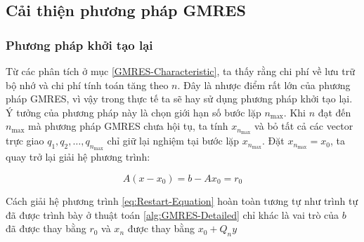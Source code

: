 \documentclass[14pt, a4paper]{article}
\numberwithin{equation}{section}
\numberwithin{algorithm}{section}
\numberwithin{figure}{section}
\numberwithin{dl}{section}
\numberwithin{md}{section}
\numberwithin{bd}{section}
\numberwithin{dn}{section}
\begin{document}
\subsection{Cải thiện phương pháp GMRES}

\subsubsection{Phương pháp khởi tạo lại}

Từ các phân tích ở mục \ref{GMRES-Characteristic}, ta thấy rằng chi phí về lưu trữ bộ nhớ và chi phí tính toán tăng theo $n$. Đây là nhược điểm rất lớn của phương pháp GMRES, vì vậy trong thực tế ta sẽ hay sử dụng phương pháp khởi tạo lại.
Ý tưởng của phương pháp này là chọn giới hạn số bước lặp $n_{\max}$. Khi $n$ đạt đến $n_{\max}$ mà phương pháp GMRES chưa hội tụ, ta tính $x_{n_{\max}}$ và bỏ tất cả các vector trực giao $q_1, q_2, \dots, q_{n_{\max}}$ chỉ giữ lại nghiệm tại bước lặp $x_{n_{\max}}$. Đặt $x_{n_{\max}}=x_0$, ta quay trở lại giải hệ phương trình:

\begin{equation} \label{eq:Restart-Equation}
    A(x - x_0) = b - A x_0 = r_0
\end{equation}

Cách giải hệ phương trình \ref{eq:Restart-Equation} hoàn toàn tương tự như trình tự đã được trình bày ở thuật toán \ref{alg:GMRES-Detailed} chỉ khác là vai trò của $b$ đã được thay bằng $r_0$ và $x_n$ được thay bằng $x_0+Q_n y$
\end{document}
